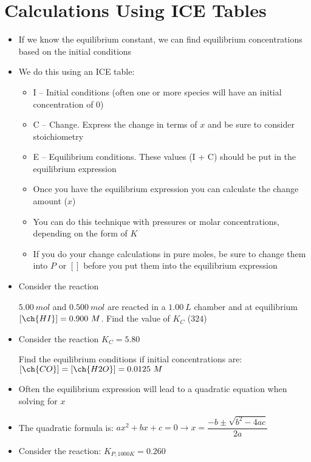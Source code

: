 \documentclass[12pt, openany, letterpaper]{memoir}
\begin{document}
\section{Calculations Using ICE Tables}
\begin{itemize}
	\item If we know the equilibrium constant, we can find equilibrium concentrations based on the initial conditions
	\item We do this using an ICE table:
	\begin{itemize}
		\item I -- Initial conditions (often one or more species will have an initial concentration of $0$)
		\item C -- Change. Express the change in terms of $x$ and be sure to consider stoichiometry
		\item E -- Equilibrium conditions. These values (I + C) should be put in the equilibrium expression
		\item Once you have the equilibrium expression you can calculate the change amount ($x$)
		\item You can do this technique with pressures or molar concentrations, depending on the form of $K$
		\item If you do your change calculations in pure moles, be sure to change them into $P$ or $[]$ before you put them into the equilibrium expression
	\end{itemize}
	\item Consider the reaction 
	
	$5.00~mol$  and $0.500~mol$  are reacted in a $1.00~L$ chamber and at equilibrium $\left[\ch{HI}\right] = 0.900~M$. Find the value of $K_C$ ($324$)
	\item Consider the reaction  \hspace{1em} $K_C=5.80$
	
	Find the equilibrium conditions if initial concentrations are: $\left[\ch{CO}\right]= \left[\ch{H2O}\right]=0.0125~M$
	\item Often the equilibrium expression will lead to a quadratic equation when solving for $x$
	\item The quadratic formula is: $ax^2 + bx + c = 0 \rightarrow x=\dfrac{-b\pm\sqrt{b^2-4ac}}{2a}$
	\item Consider the reaction:  \hspace{1em} $K_{P,1000K}=0.260$
	

\end{itemize}
\end{document}
